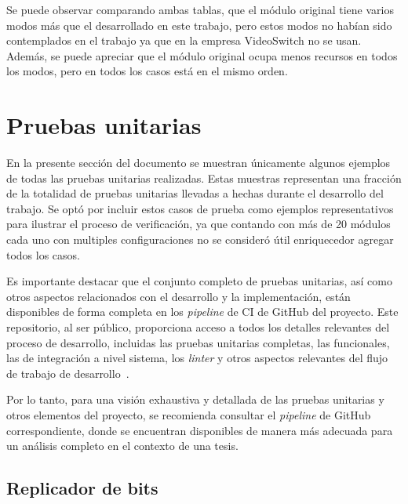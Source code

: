   Se puede observar comparando ambas tablas, que el módulo original tiene varios
  modos más que el desarrollado en este trabajo, pero estos modos no habían sido
  contemplados en el trabajo ya que en la empresa VideoSwitch no se usan. Además,
  se puede apreciar que el módulo original ocupa menos recursos en todos los
  modos, pero en todos los casos está en el mismo orden.


\section{Pruebas unitarias}

  En la presente sección del documento se muestran únicamente algunos ejemplos de
  todas las pruebas unitarias realizadas. Estas muestras representan una fracción
  de la totalidad de pruebas unitarias llevadas a hechas durante el desarrollo del
  trabajo. Se optó por incluir estos casos de prueba como ejemplos representativos
  para ilustrar el proceso de verificación, ya que contando con más de 20 módulos
  cada uno con multiples configuraciones no se consideró útil enriquecedor agregar
  todos los casos.

  Es importante destacar que el conjunto completo de pruebas unitarias, así como
  otros aspectos relacionados con el desarrollo y la implementación, están
  disponibles de forma completa en los \textit{pipeline} de CI de GitHub del
  proyecto. Este repositorio, al ser público, proporciona acceso a todos los
  detalles relevantes del proceso de desarrollo, incluidas las pruebas unitarias
  completas, las funcionales, las de integración a nivel sistema, los \textit{linter}
  y otros aspectos relevantes del flujo de trabajo de desarrollo~\citep{github}.

  Por lo tanto, para una visión exhaustiva y detallada de las pruebas unitarias
  y otros elementos del proyecto, se recomienda consultar el \textit{pipeline} de
  GitHub correspondiente, donde se encuentran disponibles de manera más adecuada
  para un análisis completo en el contexto de una tesis.


\subsection{Replicador de bits}

